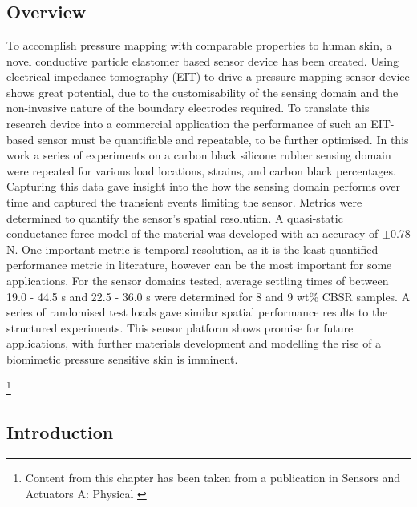 \chapter{\chapivname}
\label{chapter4}
\section*{Overview}
To accomplish pressure mapping with comparable properties to human skin, a novel conductive particle elastomer based sensor device has been created. Using electrical impedance tomography (EIT) to drive a pressure mapping sensor device shows great potential, due to the customisability of the sensing domain and the non-invasive nature of the boundary electrodes required. To translate this research device into a commercial application the performance of such an EIT-based sensor must be quantifiable and repeatable, to be further optimised. In this work a series of experiments on a carbon black silicone rubber sensing domain were repeated for various load locations, strains, and carbon black percentages. Capturing this data gave insight into the how the sensing domain performs over time and captured the transient events limiting the sensor. Metrics were determined to quantify the sensor's spatial resolution. A quasi-static conductance-force model of the material was developed with an accuracy of $\pm$0.78 N. One important metric is temporal resolution, as it is the least quantified performance metric in literature, however can be the most important for some applications. For the sensor domains tested, average settling times of between 19.0 - 44.5 s and 22.5 - 36.0 s were determined for 8 and 9 wt\% CBSR samples. A series of randomised test loads gave similar spatial performance results to the structured experiments. This sensor platform shows promise for future applications, with further materials development and modelling the rise of a biomimetic pressure sensitive skin is imminent.

\footnote{Content from this chapter has been taken from a publication in Sensors and Actuators A: Physical \cite{Ellingham2024}}

\section{Introduction} \label{sec:introduction}


